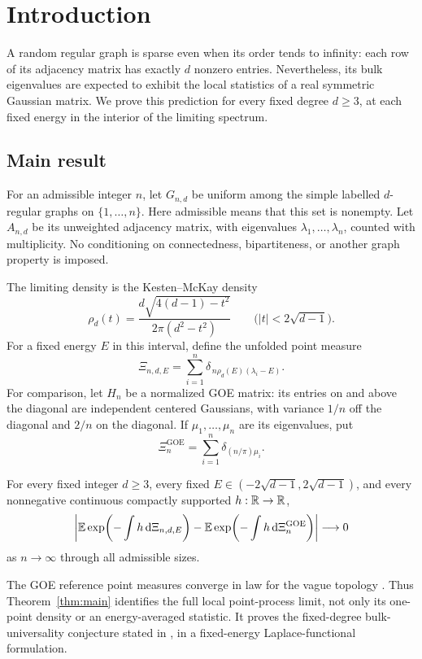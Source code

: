 \section{Introduction}\label{sec:introduction}

A random regular graph is sparse even when its order tends to infinity:
each row of its adjacency matrix has exactly \(d\) nonzero entries.
Nevertheless, its bulk eigenvalues are expected to exhibit the local
statistics of a real symmetric Gaussian matrix.
We prove this prediction for every fixed degree \(d\ge3\), at each fixed
energy in the interior of the limiting spectrum.

\subsection{Main result}

For an admissible integer \(n\), let \(G_{n,d}\) be uniform among the
simple labelled \(d\)-regular graphs on \(\{1,\ldots,n\}\).
Here admissible means that this set is nonempty.
Let \(A_{n,d}\) be its unweighted adjacency matrix, with eigenvalues
\(\lambda_1,\ldots,\lambda_n\), counted with multiplicity.
No conditioning on connectedness, bipartiteness, or another graph
property is imposed.

The limiting density is the Kesten--McKay density
\[
 \rho_d(t)=\frac{d\sqrt{4(d-1)-t^2}}{2\pi(d^2-t^2)}
 \qquad \bigl(|t|<2\sqrt{d-1}\bigr).
\]
For a fixed energy \(E\) in this interval, define the unfolded
point measure
\[
 \Xi_{n,d,E}=\sum_{i=1}^n
       \delta_{\,n\rho_d(E)(\lambda_i-E)}.
\]
For comparison, let \(H_n\) be a normalized GOE matrix: its entries on
and above the diagonal are independent centered Gaussians, with
variance \(1/n\) off the diagonal and \(2/n\) on the diagonal.
If \(\mu_1,\ldots,\mu_n\) are its eigenvalues, put
\[
 \Xi_n^{\mathrm{GOE}}
       =\sum_{i=1}^n\delta_{(n/\pi)\mu_i}.
\]

\newpage
\begin{theorem}\label{thm:main}
For every fixed integer \(d\ge3\), every fixed
\(E\in(-2\sqrt{d-1},2\sqrt{d-1})\), and every nonnegative continuous
compactly supported \(h:\mathbb R\to\mathbb R\),
\[
 \left|
 \mathbb E\exp\!\left(-\int h\,\mathrm d\Xi_{n,d,E}\right)
 -
 \mathbb E\exp\!\left(-\int h\,\mathrm d\Xi_n^{\mathrm{GOE}}\right)
 \right|\longrightarrow0
\]
as \(n\to\infty\) through all admissible sizes.
\end{theorem}

The GOE reference point measures converge in law for the vague
topology \cite{ValkoVirag}.
Thus Theorem~\ref{thm:main} identifies the full local point-process
limit, not only its one-point density or an energy-averaged statistic.
It proves the fixed-degree bulk-universality conjecture stated in
\cite[Conjecture 2.11]{BourgadeHuang}, in a fixed-energy
Laplace-functional formulation.

